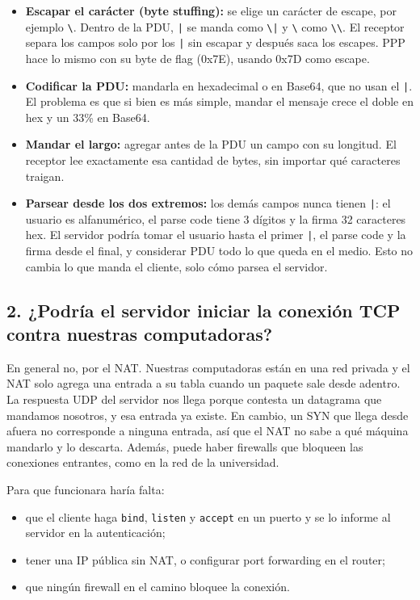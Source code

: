 \documentclass[11pt,a4paper]{article}
\begin{document}
\begin{itemize}
  \item \textbf{Escapar el carácter (byte stuffing):} se elige un carácter de escape, por ejemplo \texttt{\textbackslash}. Dentro de la PDU, \texttt{|} se manda como \texttt{\textbackslash|} y \texttt{\textbackslash} como \texttt{\textbackslash\textbackslash}. El receptor separa los campos solo por los \texttt{|} sin escapar y después saca los escapes. PPP hace lo mismo con su byte de flag (0x7E), usando 0x7D como escape.
  \item \textbf{Codificar la PDU:} mandarla en hexadecimal o en Base64, que no usan el \texttt{|}. El problema es que si bien es más simple, mandar el mensaje crece el doble en hex y un 33\% en Base64.
  \item \textbf{Mandar el largo:} agregar antes de la PDU un campo con su longitud. El receptor lee exactamente esa cantidad de bytes, sin importar qué caracteres traigan.
  \item \textbf{Parsear desde los dos extremos:} los demás campos nunca tienen \texttt{|}: el usuario es alfanumérico, el parse code tiene 3 dígitos y la firma 32 caracteres hex. El servidor podría tomar el usuario hasta el primer \texttt{|}, el parse code y la firma desde el final, y considerar PDU todo lo que queda en el medio. Esto no cambia lo que manda el cliente, solo cómo parsea el servidor.
\end{itemize}

\subsection*{2. ¿Podría el servidor iniciar la conexión TCP contra nuestras computadoras?}

En general no, por el NAT. Nuestras computadoras están en una red privada y el NAT solo agrega una entrada a su tabla cuando un paquete sale desde adentro. La respuesta UDP del servidor nos llega porque contesta un datagrama que mandamos nosotros, y esa entrada ya existe. En cambio, un SYN que llega desde afuera no corresponde a ninguna entrada, así que el NAT no sabe a qué máquina mandarlo y lo descarta. Además, puede haber firewalls que bloqueen las conexiones entrantes, como en la red de la universidad.

Para que funcionara haría falta:
\begin{itemize}
  \item que el cliente haga \texttt{bind}, \texttt{listen} y \texttt{accept} en un puerto y se lo informe al servidor en la autenticación;
  \item tener una IP pública sin NAT, o configurar port forwarding en el router;
  \item que ningún firewall en el camino bloquee la conexión.
\end{itemize}
\end{document}
